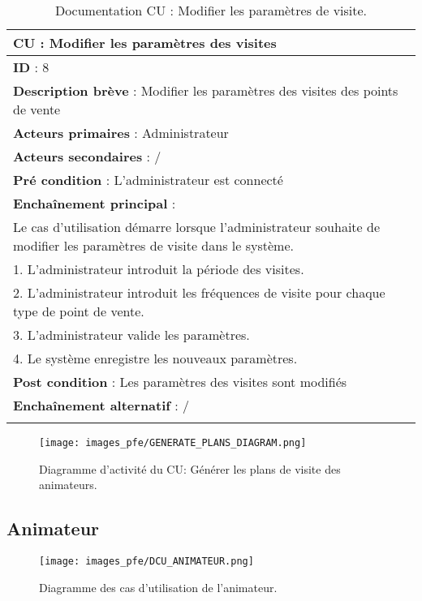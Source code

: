 \renewcommand{\arraystretch}{1.5}
\begin{xltabular}{\linewidth}{|X|}
    \hline
    \textbf{CU} : Modifier les paramètres des visites    \\\hline
    \textbf{ID} :  8   \\\hline
    \textbf{Description brève} : Modifier les paramètres des visites des points de vente      \\\hline
    \textbf{Acteurs primaires} :  Administrateur    \\\hline
    \textbf{Acteurs secondaires} :  /    \\\hline
    \textbf{Pré condition} : L'administrateur est connecté     \\\hline
    \textbf{Enchaînement principal} : \\
    Le cas d'utilisation démarre lorsque l'administrateur souhaite de modifier les paramètres de visite dans le système. \\
    1. L'administrateur introduit la période des visites. \\
    2. L'administrateur introduit les fréquences de visite pour chaque type de point de vente. \\
    3. L'administrateur valide les paramètres.\\
    4. Le système enregistre les nouveaux paramètres.
    \\\hline
    \textbf{Post condition} : Les paramètres des visites sont modifiés     \\\hline
    \textbf{Enchaînement alternatif} :   /   \\\hline

    \caption{Documentation CU : Modifier les paramètres de visite.}
    \label{tab:cu-specs3}
\end{xltabular}
\FloatBarrier

\begin{figure}[hbt!]
    \centering
    \texttt{[image: images\_pfe/GENERATE\_PLANS\_DIAGRAM.png]}
    \caption{Diagramme d'activité du CU: Générer les plans de visite des animateurs.}
    \label{fig:activity-admin}
\end{figure}
\FloatBarrier

\clearpage

\subsection{Animateur}

\begin{figure}[hbt!]
    \centering
    \texttt{[image: images\_pfe/DCU\_ANIMATEUR.png]}
    \caption{Diagramme des cas d'utilisation de l'animateur.}
    \label{fig:dcu-animateur}
\end{figure}
\FloatBarrier

